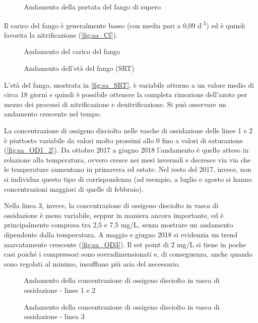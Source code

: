 \begin{figure}[H]
	\fbox{\texttt{[image: sa\_Qf]}}	\centering
	\caption{Andamento della portata del fango di supero}
	\label{fig:sa_Qf}
\end{figure}

Il carico del fango è generalmente basso (con media pari a 0,09 d\textsuperscript{-1}) ed è quindi favorita la nitrificazione (\autoref{fig:sa_Cf}). 
\begin{figure}[H]
	\fbox{\texttt{[image: sa\_Cf]}}	\centering
	\caption{Andamento del carico del fango}
	\label{fig:sa_Cf}
\end{figure}
\begin{figure}[H]
		\centering
	\caption{Andamento dell'età del fango (SRT)}
	\label{fig:sa_SRT}
\end{figure}

L'età del fango, mostrata in \autoref{fig:sa_SRT}, è variabile attorno a un valore medio di circa 18 giorni e quindi è possibile ottenere la completa rimozione dell'azoto per mezzo dei processi di nitrificazione e denitrificazione. Si può osservare un andamento crescente nel tempo.

La concentrazione di ossigeno disciolto nelle vasche di ossidazione delle linee 1 e 2 è piuttosto variabile da valori molto prossimi allo 0 fino a valori di saturazione (\autoref{fig:sa_OD1_2}). Da ottobre 2017 a giugno 2018 l'andamento è quello atteso in relazione alla temperatura, ovvero cresce nei mesi invernali e decresce via via che le temperature aumentano in primavera ed estate. Nel resto del 2017, invece, non si individua questo tipo di corrispondenza (ad esempio, a luglio e agosto si hanno concentrazioni maggiori di quelle di febbraio).

Nella linea 3, invece, la concentrazione di ossigeno disciolto in vasca di ossidazione è meno variabile, seppur in maniera ancora importante, ed è principalmente compresa tra 2,5 e 7,5 mg/L, senza mostrare un andamento dipendente dalla temperatura. A maggio e giugno 2018 si evidenzia un trend marcatamente crescente (\autoref{fig:sa_OD3}).
Il set point di 2 mg/L si tiene in poche casi poiché i compressori sono sovradimensionati e, di conseguenza, anche quando sono regolati al minimo, insufflano più aria del necessario.

\begin{figure}[H]
		\centering
	\caption{Andamento della concentrazione di ossigeno disciolto in vasca di ossidazione - linee 1 e 2}
	\label{fig:sa_OD1_2}
\end{figure}
\begin{figure}[H]
		\centering
	\caption{Andamento della concentrazione di ossigeno disciolto in vasca di ossidazione - linea 3}
	\label{fig:sa_OD3}
\end{figure}


